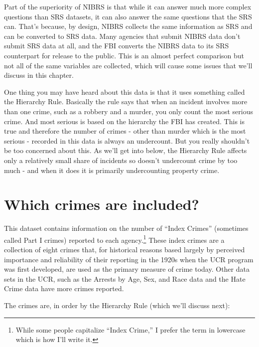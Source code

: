 \documentclass[
]{krantz}
\begin{document}
Part of the superiority of NIBRS is that while it can answer
much more complex questions than SRS datasets, it can also
answer the same questions that the SRS can. That's because,
by design, NIBRS collects the same information as SRS and
can be converted to SRS data. Many agencies that submit
NIBRS data don't submit SRS data at all, and the FBI
converts the NIBRS data to its SRS counterpart for release
to the public. This is an almost perfect comparison but not
all of the same variables are collected, which will cause
some issues that we'll discuss in this chapter.

One thing you may have heard about this data is that it uses
something called the Hierarchy Rule. Basically the rule says
that when an incident involves more than one crime, such as
a robbery and a murder, you only count the most serious
crime. And most serious is based on the hierarchy the FBI
has created. This is true and therefore the number of crimes
- other than murder which is the most serious - recorded in
this data is always an undercount. But you really shouldn't
be too concerned about this. As we'll get into below, the
Hierarchy Rule affects only a relatively small share of
incidents so doesn't undercount crime by too much - and when
it does it is primarily undercounting property crime.

\section{Which crimes are
included?}\label{indexCrimesOffensesKnown}

This dataset contains information on the number of ``Index
Crimes'' (sometimes called Part I crimes) reported to each
agency.\footnote{While some people capitalize ``Index
  Crime,'' I prefer the term in lowercase which is how I'll
  write it.} These index crimes are a collection of eight
crimes that, for historical reasons based largely by
perceived importance and reliability of their reporting in
the 1920s when the UCR program was first developed, are used
as the primary measure of crime today. Other data sets in
the UCR, such as the Arrests by Age, Sex, and Race data and
the Hate Crime data have more crimes reported.

The crimes are, in order by the Hierarchy Rule (which we'll
discuss next):
\end{document}
